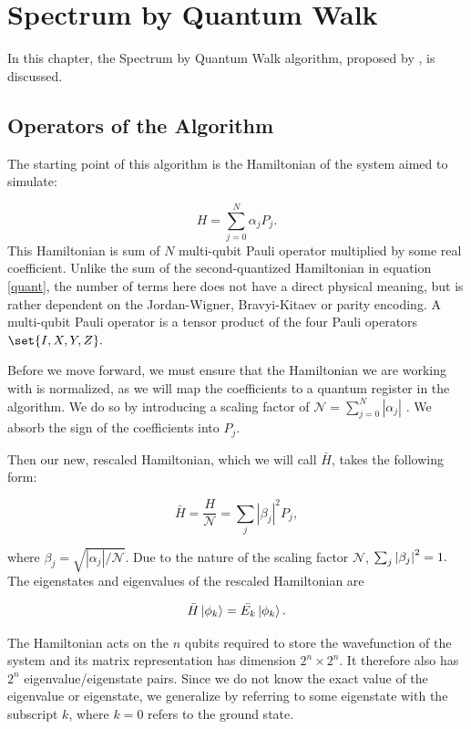 
\chapter{Spectrum by Quantum Walk}

In this chapter, the Spectrum by Quantum Walk algorithm, proposed by \textcite{poulin}, is discussed. 

\section{Operators of the Algorithm}
The starting point of this algorithm is the Hamiltonian of the system aimed to simulate:

$$
H = \sum_{j=0}^N \alpha_j P_j.
$$
This Hamiltonian is sum of $N$ multi-qubit Pauli operator multiplied by some real coefficient. Unlike the sum of the second-quantized Hamiltonian in equation \ref{quant}, the number of terms here does not have a direct physical meaning, but is rather dependent on the Jordan-Wigner, Bravyi-Kitaev or parity encoding. A multi-qubit Pauli operator is a tensor product of the four Pauli operators $\set{I, X, Y, Z}. $

Before we move forward, we must ensure that the Hamiltonian we are working with is normalized, as we will map the coefficients to a quantum register in the algorithm. We do so by introducing a scaling factor of $\mathcal{N} = \sum_{j=0}^N |\alpha_j|$ \cite{poulin}. We absorb the sign of the coefficients into $P_j$.

Then our new, rescaled Hamiltonian, which we will call $\bar{H}$, takes the following form:

\begin{equation}
	\bar H = \frac H{\mathcal{N}} = \sum_j|\beta_j|^2 P_j,
\end{equation}

where $\beta_j = \sqrt{|\alpha_j|/\mathcal{N}}$. Due to the nature of the scaling factor $\mathcal{N}$,   $\sum_j \abs{\beta_j}^2 = 1.$ The eigenstates and eigenvalues of the rescaled Hamiltonian are

\begin{equation}
	 \bar{H} \left\vert{\phi_k}\right\rangle = \bar{E_k} \left\vert{\phi_k}\right\rangle.
\end{equation}

The Hamiltonian acts on the $n$ qubits required to store the wavefunction of the system and its matrix representation has dimension $2^n \times 2^n$. It therefore also has $2^n$ eigenvalue/eigenstate pairs. Since we do not know the exact value of the eigenvalue or eigenstate, we generalize by referring to some eigenstate with the subscript $k$, where $k = 0$ refers to the ground state.

